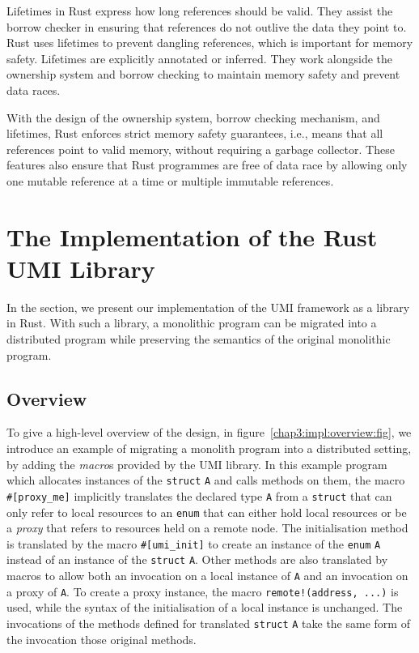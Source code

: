 Lifetimes in Rust express how long references should be valid. They assist the borrow checker in ensuring that references do not outlive the data they point to. Rust uses lifetimes to prevent dangling references, which is important for memory safety. Lifetimes are explicitly annotated or inferred. They work alongside the ownership system and borrow checking to maintain memory safety and prevent data races.

With the design of the ownership system, borrow checking mechanism, and lifetimes, Rust enforces strict memory safety guarantees, i.e., means that all references point to valid memory, without requiring a garbage collector. These features also ensure that Rust programmes are free of data race by allowing only one mutable reference at a time or multiple immutable references.

\section{The Implementation of the Rust UMI Library}
\label{chap3:implementation}
In the section, we present our implementation of the UMI framework as a library in Rust. With such a library, a monolithic program can be migrated into a distributed program while preserving the semantics of the original monolithic program.

\subsection{Overview}
\label{chap3:impl:overview}
To give a high-level overview of the design, in figure~\ref{chap3:impl:overview:fig}, we introduce an example of migrating a monolith program into a distributed setting, by adding the \emph{macro}s provided by the UMI library. In this example program which allocates instances of the \texttt{struct} \texttt{A} and calls methods on them, the macro \texttt{\#[proxy\_me]} implicitly translates the declared type \texttt{A} from a \texttt{struct} that can only refer to local resources to an \texttt{enum} that can either hold local resources or be a \emph{proxy} that refers to resources held on a remote node. The initialisation method is translated by the macro \texttt{\#[umi\_init]} to create an instance of the \texttt{enum} \texttt{A} instead of an instance of the \texttt{struct} \texttt{A}. Other methods are also translated by macros to allow both an invocation on a local instance of \texttt{A} and an invocation on a proxy of \texttt{A}. To create a proxy instance, the macro \texttt{remote!(address, ...)} is used, while the syntax of the initialisation of a local instance is unchanged. The invocations of the methods defined for translated \texttt{struct} \texttt{A} take the same form of the invocation those original methods.

